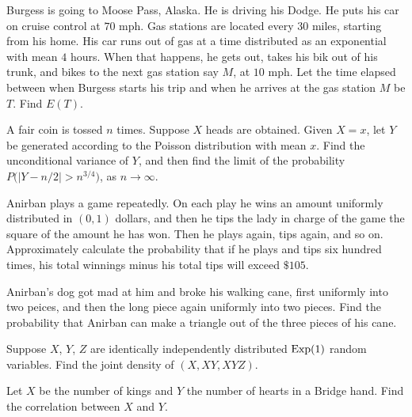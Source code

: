 \begin{problem}
  Burgess is going to Moose Pass, Alaska. He is driving his Dodge. He puts
  his car on cruise control at \(70\) mph. Gas stations are located every
  \(30\) miles, starting from his home. His car runs out of gas at a time
  distributed as an exponential with mean \(4\) hours. When that happens,
  he gets out, takes his bik out of his trunk, and bikes to the next gas
  station say \(M\), at \(10\) mph. Let the time elapsed between
  when Burgess starts his trip and when he arrives at the gas station \(M\)
  be \(T\). Find \(E(T)\).
\end{problem}
\begin{solution*}
\end{solution*}

\begin{problem}
  A fair coin is tossed \(n\) times. Suppose \(X\) heads are
  obtained. Given \(X=x\), let \(Y\) be generated according to the Poisson
  distribution with mean \(x\). Find the unconditional variance of \(Y\),
  and then find the limit of the probability
  \(P\bigl(|Y-n/2|>n^{3/4}\bigr)\), as \(n\to\infty\).
\end{problem}
\begin{solution*}
\end{solution*}

\begin{problem}
  Anirban plays a game repeatedly. On each play he wins an amount uniformly
  distributed in \((0,1)\) dollars, and then he tips the lady in charge of the
  game the square of the amount he has won. Then he plays again, tips
  again, and so on. Approximately calculate the probability that if he
  plays and tips six hundred times, his total winnings minus his total tips
  will exceed \(\$105\).
\end{problem}
\begin{solution*}
\end{solution*}

\begin{problem}
  Anirban's dog got mad at him and broke his walking cane, first uniformly
  into two peices, and then the long piece again uniformly into two
  pieces. Find the probability that Anirban can make a triangle out of the
  three pieces of his cane.
\end{problem}
\begin{solution*}
\end{solution*}

\begin{problem}
  Suppose \(X\), \(Y\), \(Z\) are identically independently distributed
  \(\operatorname{Exp}(1)\) random variables. Find the joint density of \((X,XY,XYZ)\).
\end{problem}
\begin{solution*}
\end{solution*}

\begin{problem}
  Let \(X\) be the number of kings and \(Y\) the number of hearts in a
  Bridge hand. Find the correlation between \(X\) and \(Y\).
\end{problem}
\begin{solution*}
\end{solution*}

